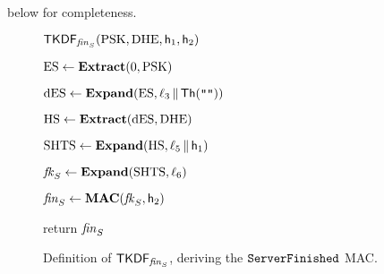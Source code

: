 		below for completeness.
	


\begin{figure}[t]
	\centering
	\begin{minipage}{5.5cm}
	\begin{algorithm}{$\mathsf{TKDF}_{\mathit{fin}_S}(\mathrm{PSK}, \mathrm{DHE}, \mathsf{h}_1, \mathsf{h}_2)$}
		\item $\mathrm{ES} \gets \mathbf{Extract} (0, \mathrm{PSK})$
		\item $\mathrm{dES} \gets \mathbf{Expand}(\mathrm{ES}, \ell_{3} {\,\|\,} \mathsf{Th}(\texttt{""}))$
		\item $\mathrm{HS} \gets \mathbf{Extract}(\mathrm{dES}, \mathrm{DHE})$
	\end{algorithm}
	\end{minipage}
	\begin{minipage}{5.5cm}
	\begin{code}[start=4]
		\item $\mathrm{SHTS} \gets \mathbf{Expand}(\mathrm{HS}, \ell_{5} {\,\|\,} \mathsf{h}_1)$
		\item $\mathit{fk}_S \gets \mathbf{Expand}(\mathrm{SHTS}, \ell_{6})$
		\item $\mathit{fin}_S \gets \mathbf{MAC}(\mathit{fk}_S, \mathsf{h}_2)$
		\item return $\mathit{fin}_S$
	\end{code}
	\end{minipage}
	
	\caption{Definition of $\mathsf{TKDF}_{\mathit{fin}_S}$, deriving the $\mathtt{ServerFinished}$ MAC.}
	\label{fig:TLSKDF-sfin}
\end{figure}



